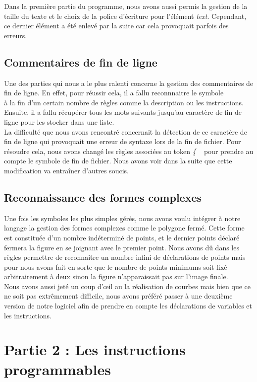		Dans la première partie du programme, nous avons aussi permis la gestion de la taille du texte et le choix de la police d'écriture pour l'élément \emph{text}. Cependant, ce dernier élément a été enlevé par la suite car cela provoquait parfois des erreurs.
	
		\subsection{Commentaires de fin de ligne}
		Une des parties qui nous a le plus ralenti concerne la gestion des commentaires de fin de ligne. En effet, pour réussir cela, il a fallu reconnnaitre le symbole \emph{\\} à la fin d'un certain nombre de règles comme la description ou les instructions. Ensuite, il a fallu récupérer tous les mots suivants jusqu'au caractère de fin de ligne pour les stocker dans une liste.\\
		
		La difficulté que nous avons rencontré concernait la détection de ce caractère de fin de ligne qui provoquait une erreur de syntaxe lors de la fin de fichier. Pour résoudre cela, nous avons changé les règles associées au token \og \emph{\{} \fg ~ pour prendre au compte le symbole de fin de fichier. Nous avons voir dans la suite que cette modification va entraîner d'autres soucis.
	
		\subsection{Reconnaissance des formes complexes}
		Une fois les symboles les plus simples gérés, nous avons voulu intégrer à notre langage la gestion des formes complexes comme le polygone fermé. Cette forme est constituée d'un nombre indéterminé de points, et le dernier points déclaré fermera la figure en se joignant avec le premier point. Nous avons dû dans les règles permettre de reconnaitre un nombre infini de déclarations de points mais pour nous avons fait en sorte que le nombre de points minimums soit fixé arbitrairement à deux sinon la figure n'apparaissait pas sur l'image finale.\\
		
		Nous avons aussi jeté un coup d'œil au la réalisation de courbes mais bien que ce ne soit pas extrêmement difficile, nous avons préféré passer à une deuxième version de notre logiciel afin de prendre en compte les déclarations de variables et les instructions.
	\section{Partie 2 : Les instructions programmables}

